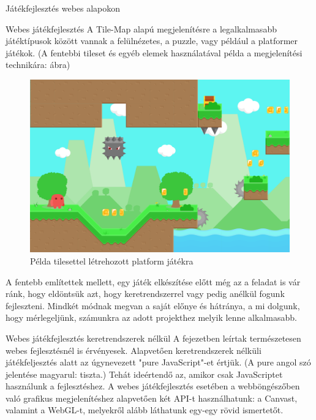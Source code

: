 \begin{MyChapter}{Játékfejlesztés webes alapokon}
\begin{MySection}{Webes játékfejlesztés}
		A Tile-Map alapú megjelenítésre a legalkalmasabb játéktípusok között vannak a felülnézetes, a puzzle, vagy például a platformer játékok. (A fentebbi tileset és egyéb elemek használatával példa a megjelenítési technikára:  ábra)
		\begin{figure}[H]
			\centering
			\includegraphics[scale=0.35]{kepek/tileMap/TileMapPreview.png}
			\caption{Példa tilesettel létrehozott platform játékra}
			\label{fig:tileMap:tileMapPreview}
		\end{figure}
		
		A fentebb említettek mellett, egy játék elkészítése előtt még az a feladat is vár ránk, hogy eldöntsük azt, hogy keretrendszerrel vagy pedig anélkül fogunk fejleszteni. 
		Mindkét módnak megvan a saját előnye és hátránya, a mi dolgunk, hogy mérlegeljünk, számunkra az adott projekthez melyik lenne alkalmasabb.
	\end{MySection}

	\begin{MySection}{Webes játékfejlesztés keretrendszerek nélkül}
		A  fejezetben leírtak természetesen webes fejlesztésnél is érvényesek.
		Alapvetően keretrendszerek nélküli játékfeljesztés alatt az úgynevezett "pure JavaScript"-et értjük. (A pure angol szó jelentése magyarul: tiszta.)
		Tehát ideértendő az, amikor csak JavaScriptet használunk a fejlesztéshez. 
		A webes játékfejlesztés esetében a webböngészőben való grafikus megjelenítéshez alapvetően két API-t használhatunk: a Canvast, valamint a WebGL-t, melyekről alább láthatunk egy-egy rövid ismertetőt.
		

\end{MySection}
\end{MyChapter}
